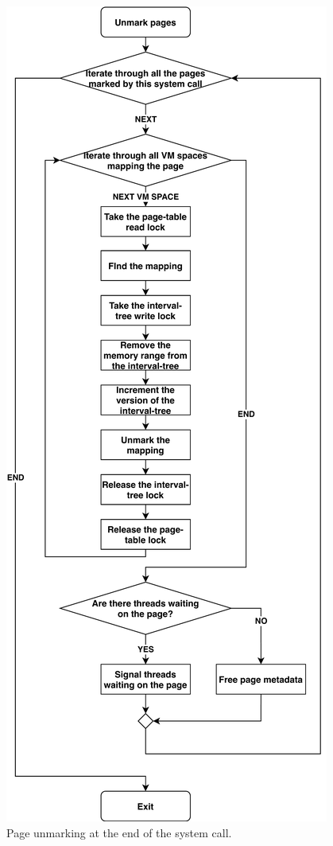 \documentclass[conference]{IEEEtran}
\begin{document}
\begin{figure}[]
  \centering
  \includegraphics[width = 0.8\linewidth]{img/unmark_pages.pdf}
  \caption{Page unmarking at the end of the system call.
}
  \label{fig:unmarking}
\end{figure}
\end{document}
